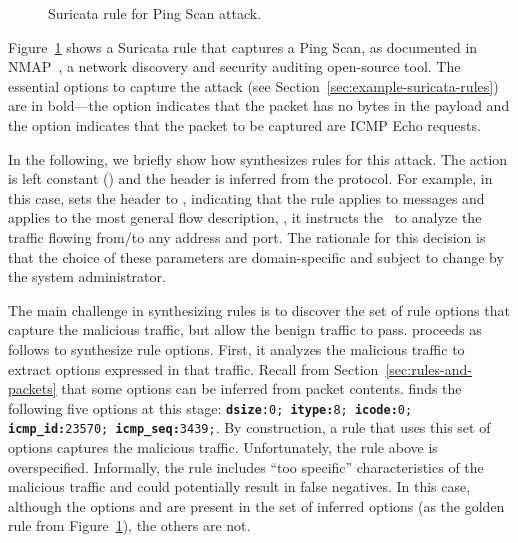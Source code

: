 \documentclass[sigconf,review, anonymous]{acmart}
\begin{document}
\begin{figure}[h!]
  
  \vspace{-2ex}  
  \caption{Suricata rule for Ping Scan attack.}
  \label{fig:pingscan-example}
\end{figure}
\vspace{-3ex}

Figure~\ref{fig:pingscan-example} shows a Suricata rule that captures
a Ping Scan, as documented in NMAP~\cite{netmap}, a network discovery
and security auditing open-source tool. The essential options to
capture the attack (see Section~\ref{sec:example-suricata-rules}) are
in bold---the option  indicates that the packet has
no bytes in the payload and the option  indicates
that the packet to be captured are ICMP Echo requests.

In the following, we briefly show how \tname{} synthesizes rules for
this attack. The action is left constant () and the
header is inferred from the protocol. For example, in this case,
\tname{} sets the header to ,
indicating that the rule applies to  messages and applies
to the most general flow description, \ie{}, it instructs the
\nids\ to analyze the traffic flowing from/to any address and port.
The rationale for this decision is that the choice of these parameters
are domain-specific and subject to change by the system administrator.

The main challenge in synthesizing rules is to discover the set of
rule options that capture the malicious traffic, but allow the benign
traffic to pass. \tname{} proceeds as follows to synthesize rule
options. First, it analyzes the malicious traffic to extract options
expressed in that traffic. Recall from
Section~\ref{sec:rules-and-packets} that some options can be inferred
from packet contents. \tname{} finds the following five options at
this stage: {\scriptsize{\texttt{\textbf{dsize}:0; \textbf{itype:}8;
      \textbf{icode:}0; \textbf{icmp\_id:}23570;
      \textbf{icmp\_seq:}3439;}}}.  By construction, a rule that uses
this set of options captures the malicious traffic. Unfortunately, the
rule above is overspecified. Informally, the rule includes ``too
specific'' characteristics of the malicious traffic and could
potentially result in false negatives. In this case, although the
options  and  are present in the set
of inferred options (as the golden rule from
Figure~\ref{fig:pingscan-example}), the others are not.
\end{document}
